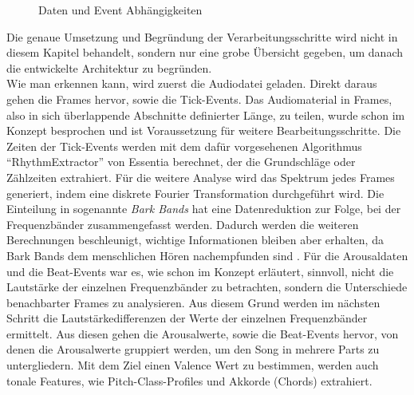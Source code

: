 \documentclass[11pt,a4paper]{article}
\begin{document}
\begin{wrapfigure}{r}{0.4\linewidth}
\captionsetup{justification=centering}
\caption[Daten und Event Abhängigkeiten]{Daten und Event Abhängigkeiten}
\end{wrapfigure}
\noindent
Die genaue Umsetzung und Begründung der Verarbeitungsschritte wird nicht in diesem Kapitel behandelt, sondern nur eine grobe Übersicht gegeben, um danach die entwickelte Architektur zu begründen.\\
Wie man erkennen kann, wird zuerst die Audiodatei geladen. Direkt daraus gehen die Frames hervor, sowie die Tick-Events. Das Audiomaterial in Frames, also in sich überlappende Abschnitte definierter Länge, zu teilen, wurde schon im Konzept besprochen und ist Voraussetzung für weitere Bearbeitungsschritte. Die Zeiten der Tick-Events werden mit dem dafür vorgesehenen Algorithmus ``RhythmExtractor'' von Essentia berechnet, der die Grundschläge oder Zählzeiten extrahiert. Für die weitere Analyse wird das Spektrum jedes Frames generiert, indem eine diskrete Fourier Transformation durchgeführt wird. Die Einteilung in sogenannte \textit{Bark Bands} hat eine Datenreduktion zur Folge, bei der Frequenzbänder zusammengefasst werden. Dadurch werden die weiteren Berechnungen beschleunigt, wichtige Informationen bleiben aber erhalten, da Bark Bands dem menschlichen Hören nachempfunden sind \cite[S. 80]{lerch2012introduction}. Für die Arousaldaten und die Beat-Events war es, wie schon im Konzept erläutert, sinnvoll, nicht die Lautstärke der einzelnen Frequenzbänder zu betrachten, sondern die Unterschiede benachbarter Frames zu analysieren. Aus diesem Grund werden im nächsten Schritt die Lautstärkedifferenzen der Werte der einzelnen Frequenzbänder ermittelt. Aus diesen gehen die Arousalwerte, sowie die Beat-Events hervor, von denen die Arousalwerte gruppiert werden, um den Song in mehrere Parts zu untergliedern. Mit dem Ziel einen Valence Wert zu bestimmen, werden auch tonale Features, wie Pitch-Class-Profiles und Akkorde (Chords) extrahiert.\\
\end{document}
